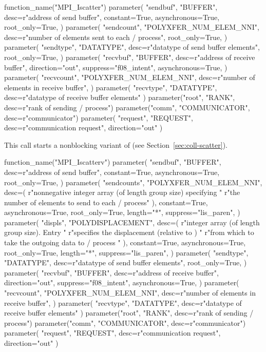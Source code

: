 \begin{mpi-binding}
    function_name("MPI_Iscatter")
    parameter(
        "sendbuf",
        "BUFFER",
        desc=r"address of send buffer",
        constant=True,
        asynchronous=True,
        root_only=True,
    )
    parameter(
        "sendcount",
        "POLYXFER_NUM_ELEM_NNI",
        desc=r"number of elements sent to each \MPI/ process",
        root_only=True,
    )
    parameter(
        "sendtype",
        "DATATYPE",
        desc=r"datatype of send buffer elements",
        root_only=True,
    )
    parameter(
        "recvbuf",
        "BUFFER",
        desc=r"address of receive buffer",
        direction="out",
        suppress="f08_intent",
        asynchronous=True,
    )
    parameter(
        "recvcount",
        "POLYXFER_NUM_ELEM_NNI",
        desc=r"number of elements in receive buffer",
    )
    parameter(
        "recvtype", "DATATYPE", desc=r"datatype of receive buffer elements"
    )
    parameter("root", "RANK", desc=r"rank of sending \MPI/ process")
    parameter("comm", "COMMUNICATOR", desc=r"communicator")
    parameter(
        "request", "REQUEST", desc=r"communication request", direction="out"
    )
\end{mpi-binding}

This call starts a nonblocking variant of  (see
Section~\ref{sec:coll-scatter}).

\begin{mpi-binding}
    function_name("MPI_Iscatterv")
    parameter(
        "sendbuf",
        "BUFFER",
        desc=r"address of send buffer",
        constant=True,
        asynchronous=True,
        root_only=True,
    )
    parameter(
        "sendcounts",
        "POLYXFER_NUM_ELEM_NNI",
        desc=(
            r"nonnegative integer array (of length group size) specifying "
            r"the number of elements to send to each \MPI/ process"
        ),
        constant=True,
        asynchronous=True,
        root_only=True,
        length="*",
        suppress="lis_paren",
    )
    parameter(
        "displs",
        "POLYDISPLACEMENT",
        desc=(
            r"integer array (of length group size). Entry  "
            r"specifies the displacement (relative to ) "
            r"from which to take the outgoing data to \MPI/ process "
        ),
        constant=True,
        asynchronous=True,
        root_only=True,
        length="*",
        suppress="lis_paren",
    )
    parameter(
        "sendtype",
        "DATATYPE",
        desc=r"datatype of send buffer elements",
        root_only=True,
    )
    parameter(
        "recvbuf",
        "BUFFER",
        desc=r"address of receive buffer",
        direction="out",
        suppress="f08_intent",
        asynchronous=True,
    )
    parameter(
        "recvcount",
        "POLYXFER_NUM_ELEM_NNI",
        desc=r"number of elements in receive buffer",
    )
    parameter(
        "recvtype", "DATATYPE", desc=r"datatype of receive buffer elements"
    )
    parameter("root", "RANK", desc=r"rank of sending \MPI/ process")
    parameter("comm", "COMMUNICATOR", desc=r"communicator")
    parameter(
        "request", "REQUEST", desc=r"communication request", direction="out"
    )
\end{mpi-binding}

